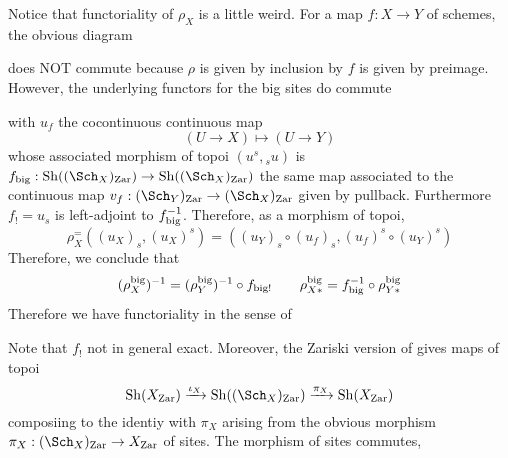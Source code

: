 \documentclass[12pt]{article}
\begin{document}
Notice that functoriality of $\rho_X$ is a little weird. For a map $f : X \to Y$ of schemes, the obvious diagram
\begin{center}
\end{center}
does NOT commute because $\rho$ is given by inclusion by $f$ is given by preimage. However, the underlying functors for the big sites do commute
\begin{center}
\end{center}
with $u_f$ the cocontinuous continuous map 
\[ (U \to X) \mapsto (U \to Y) \]
whose associated morphism of topoi $(u^s, {}_s u)$ is $f_{\big} : \Sh((\Sch_X)_{\Zar}) \to \Sh((\Sch_X)_{\Zar})$ the same map associated to the continuous map $v_f : (\Sch_Y)_{\Zar} \to (\Sch_X)_{\Zar}$ given by pullback. Furthermore $f_{\big !} = u_s$ is left-adjoint to $f_{\big}^{-1}$. Therefore, as a morphism of topoi,
\[ \rho_X^\big = ((u_X)_s, (u_X)^s) = ( (u_Y)_s \circ (u_f)_s, (u_f)^s \circ (u_Y)^s) \]
Therefore, we conclude that
\[ (\rho_X^\big)^{-1} = (\rho_Y^\big)^{-1} \circ f_{\big !} \quad \quad \rho_{X*}^\big = f_{\big}^{-1} \circ \rho_{Y *}^\big \]
Therefore we have functoriality in the sense of
\begin{center}
\end{center}
Note that $f_!$ not in general exact. Moreover, the Zariski version of  gives maps of topoi
\[ \Sh(X_{\Zar}) \xrightarrow{\iota_X} \Sh((\Sch_X)_{\Zar}) \xrightarrow{\pi_X} \Sh(X_{\Zar})\] 
composiing to the identiy with $\pi_X$ arising from the obvious morphism $\pi_X : (\Sch_X)_{\Zar} \to X_{\Zar}$ of sites. The morphism of sites commutes,
\begin{center}
\end{center}
\end{document}

